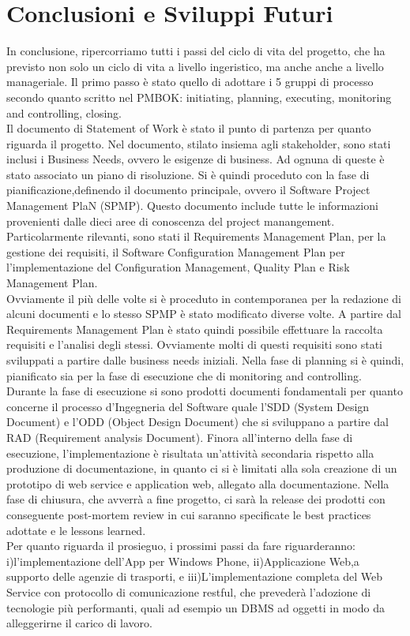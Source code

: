 \documentclass[conference]{IEEEtran}
\begin{document}
\section{Conclusioni e Sviluppi Futuri}
In conclusione, ripercorriamo tutti i passi del ciclo di vita del progetto, che ha previsto non solo un ciclo di vita a livello ingeristico, ma anche anche a livello manageriale. Il primo passo \`{e} stato quello di adottare i 5 gruppi di processo secondo quanto scritto nel PMBOK: initiating, planning, executing, monitoring and controlling, closing.\\
Il documento di Statement of Work \`{e} stato il punto di partenza per quanto riguarda il progetto. Nel documento, stilato insiema agli stakeholder, sono stati inclusi i Business Needs, ovvero le esigenze di business. Ad ognuna di queste \`{e} stato associato un piano di risoluzione.
Si \`{e} quindi proceduto con la fase di pianificazione,definendo il documento principale, ovvero il Software Project Management PlaN (SPMP). Questo documento include tutte le informazioni provenienti dalle dieci aree di conoscenza del project manangement. Particolarmente rilevanti, sono stati il Requirements Management Plan, per la gestione dei requisiti, il Software Configuration Management Plan per l\rq implementazione del Configuration Management, Quality Plan e Risk Management Plan.\\
Ovviamente il pi\`{u} delle volte si \`{e} proceduto in contemporanea per la redazione di alcuni documenti e lo stesso SPMP \`{e} stato modificato diverse volte.
A partire dal Requirements Management Plan \`{e} stato quindi possibile effettuare la raccolta requisiti e l\rq analisi degli stessi. Ovviamente molti di questi requisiti sono stati sviluppati a partire dalle business needs iniziali. 
Nella fase di planning si \`{e} quindi, pianificato sia per la fase di esecuzione che di monitoring and controlling. \\
Durante la fase di esecuzione si sono prodotti documenti fondamentali per quanto concerne il processo d\rq Ingegneria del Software quale l\rq SDD (System Design Document) e l\rq ODD (Object Design Document) che si sviluppano a partire dal RAD (Requirement analysis Document).
Finora all\rq interno della fase di esecuzione, l\rq implementazione \`{e} risultata un\rq attivit\`{a} secondaria rispetto alla produzione di documentazione, in quanto ci si \`{e} limitati alla sola creazione di un prototipo di web service e application web, allegato alla documentazione.
Nella fase di chiusura, che avverr\`{a} a fine progetto, ci sar\`{a} la release dei prodotti con conseguente post-mortem review in cui saranno specificate le best practices adottate e le lessons learned.\\
Per quanto riguarda il prosieguo, i prossimi passi da fare riguarderanno: i)l\rq implementazione dell\rq App per Windows Phone, ii)Applicazione Web,a supporto delle agenzie di trasporti, e iii)L\rq implementazione completa del Web Service con protocollo di comunicazione restful, che preveder\`{a} l\rq adozione di tecnologie pi\`{u} performanti, quali ad esempio un DBMS ad oggetti in modo da alleggerirne il carico di lavoro.
\end{document}
